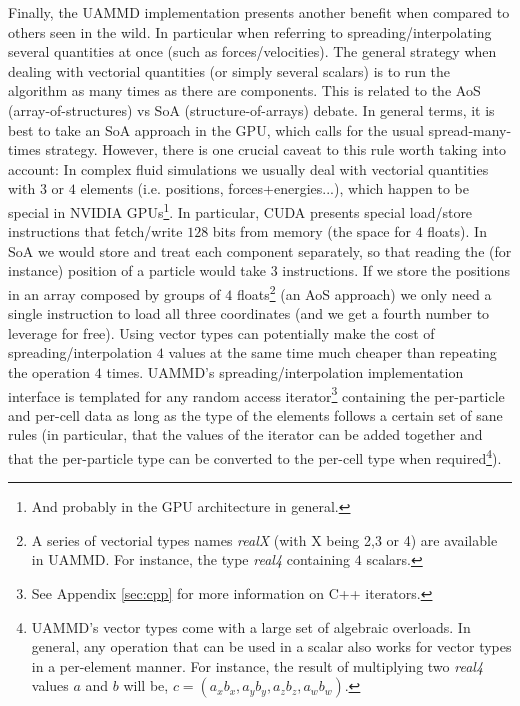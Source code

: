 \documentclass[twoside,openright,titlepage,numbers=noenddot,%
headinclude,footinclude,cleardoublepage=empty,abstract=on,
BCOR=5mm,fontsize=11pt, dvipsnames, paper=b5
]{scrreprt}
\newcommand{\uammd}{\gls{UAMMD}\xspace}
\begin{document}
Finally, the \uammd implementation presents another benefit when compared to others seen in the wild. In particular when referring to spreading/interpolating several quantities at once (such as forces/velocities). The general strategy when dealing with vectorial quantities (or simply several scalars) is to run the algorithm as many times as there are components. This is related to the AoS (array-of-structures) vs SoA (structure-of-arrays) debate. In general terms, it is best to take an SoA approach in the GPU, which calls for the usual spread-many-times strategy. However, there is one crucial caveat to this rule worth taking into account: In complex fluid simulations we usually deal with vectorial quantities with $3$ or $4$ elements (i.e. positions, forces+energies...), which happen to be special in NVIDIA GPUs\footnote{And probably in the GPU architecture in general.}. In particular, CUDA presents special load/store instructions that fetch/write $128$ bits from memory (the space for $4$ floats). In SoA we would store and treat each component separately, so that reading the (for instance) position of a particle would take $3$ instructions. If we store the positions in an array composed by groups of $4$ floats\footnote{A series of vectorial types names \emph{realX} (with X being 2,3 or 4) are available in \uammd. For instance, the type \emph{real4} containing $4$ scalars.} (an AoS approach) we only need a single instruction to load all three coordinates (and we get a fourth number to leverage for free). Using vector types can potentially make the cost of spreading/interpolation $4$ values at the same time much cheaper than repeating the operation $4$ times. \uammd's spreading/interpolation implementation interface is templated for any random access iterator\footnote{See Appendix \ref{sec:cpp} for more information on C++ iterators.} containing the per-particle and per-cell data as long as the type of the elements follows a certain set of sane rules (in particular, that the values of the iterator can be added together and that the per-particle type can be converted to the per-cell type when required\footnote{\uammd's vector types come with a large set of algebraic overloads. In general, any operation that can be used in a scalar also works for vector types in a per-element manner. For instance, the result of multiplying two \emph{real4} values $a$ and $b$ will be, $c = (a_xb_x, a_yb_y, a_zb_z, a_wb_w)$.}).
\end{document}
